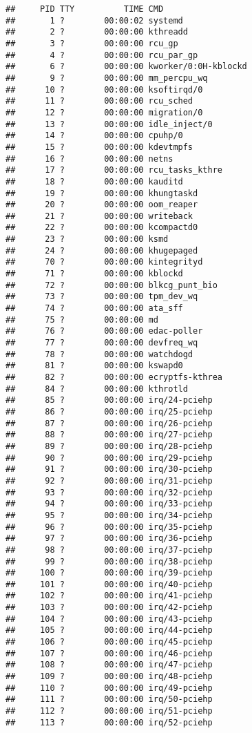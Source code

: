 \documentclass[]{article}
\begin{document}
\begin{verbatim}
##     PID TTY          TIME CMD
##       1 ?        00:00:02 systemd
##       2 ?        00:00:00 kthreadd
##       3 ?        00:00:00 rcu_gp
##       4 ?        00:00:00 rcu_par_gp
##       6 ?        00:00:00 kworker/0:0H-kblockd
##       9 ?        00:00:00 mm_percpu_wq
##      10 ?        00:00:00 ksoftirqd/0
##      11 ?        00:00:00 rcu_sched
##      12 ?        00:00:00 migration/0
##      13 ?        00:00:00 idle_inject/0
##      14 ?        00:00:00 cpuhp/0
##      15 ?        00:00:00 kdevtmpfs
##      16 ?        00:00:00 netns
##      17 ?        00:00:00 rcu_tasks_kthre
##      18 ?        00:00:00 kauditd
##      19 ?        00:00:00 khungtaskd
##      20 ?        00:00:00 oom_reaper
##      21 ?        00:00:00 writeback
##      22 ?        00:00:00 kcompactd0
##      23 ?        00:00:00 ksmd
##      24 ?        00:00:00 khugepaged
##      70 ?        00:00:00 kintegrityd
##      71 ?        00:00:00 kblockd
##      72 ?        00:00:00 blkcg_punt_bio
##      73 ?        00:00:00 tpm_dev_wq
##      74 ?        00:00:00 ata_sff
##      75 ?        00:00:00 md
##      76 ?        00:00:00 edac-poller
##      77 ?        00:00:00 devfreq_wq
##      78 ?        00:00:00 watchdogd
##      81 ?        00:00:00 kswapd0
##      82 ?        00:00:00 ecryptfs-kthrea
##      84 ?        00:00:00 kthrotld
##      85 ?        00:00:00 irq/24-pciehp
##      86 ?        00:00:00 irq/25-pciehp
##      87 ?        00:00:00 irq/26-pciehp
##      88 ?        00:00:00 irq/27-pciehp
##      89 ?        00:00:00 irq/28-pciehp
##      90 ?        00:00:00 irq/29-pciehp
##      91 ?        00:00:00 irq/30-pciehp
##      92 ?        00:00:00 irq/31-pciehp
##      93 ?        00:00:00 irq/32-pciehp
##      94 ?        00:00:00 irq/33-pciehp
##      95 ?        00:00:00 irq/34-pciehp
##      96 ?        00:00:00 irq/35-pciehp
##      97 ?        00:00:00 irq/36-pciehp
##      98 ?        00:00:00 irq/37-pciehp
##      99 ?        00:00:00 irq/38-pciehp
##     100 ?        00:00:00 irq/39-pciehp
##     101 ?        00:00:00 irq/40-pciehp
##     102 ?        00:00:00 irq/41-pciehp
##     103 ?        00:00:00 irq/42-pciehp
##     104 ?        00:00:00 irq/43-pciehp
##     105 ?        00:00:00 irq/44-pciehp
##     106 ?        00:00:00 irq/45-pciehp
##     107 ?        00:00:00 irq/46-pciehp
##     108 ?        00:00:00 irq/47-pciehp
##     109 ?        00:00:00 irq/48-pciehp
##     110 ?        00:00:00 irq/49-pciehp
##     111 ?        00:00:00 irq/50-pciehp
##     112 ?        00:00:00 irq/51-pciehp
##     113 ?        00:00:00 irq/52-pciehp

\end{verbatim}
\end{document}
